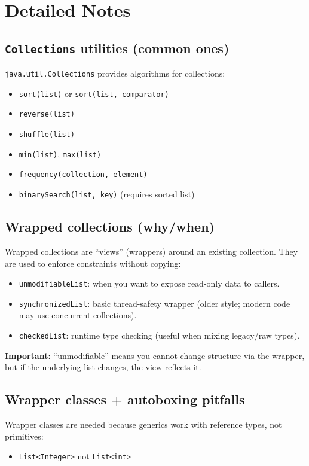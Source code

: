 \documentclass[11pt]{article}
\begin{document}
\section{Detailed Notes}
\subsection{\texttt{Collections} utilities (common ones)}
\texttt{java.util.Collections} provides algorithms for collections:
\begin{itemize}
  \item \texttt{sort(list)} or \texttt{sort(list, comparator)}
  \item \texttt{reverse(list)}
  \item \texttt{shuffle(list)}
  \item \texttt{min(list)}, \texttt{max(list)}
  \item \texttt{frequency(collection, element)}
  \item \texttt{binarySearch(list, key)} (requires sorted list)
\end{itemize}

\subsection{Wrapped collections (why/when)}
Wrapped collections are ``views'' (wrappers) around an existing collection.
They are used to enforce constraints without copying:
\begin{itemize}
  \item \texttt{unmodifiableList}: when you want to expose read-only data to callers.
  \item \texttt{synchronizedList}: basic thread-safety wrapper (older style; modern code may use concurrent collections).
  \item \texttt{checkedList}: runtime type checking (useful when mixing legacy/raw types).
\end{itemize}

\textbf{Important:} ``unmodifiable'' means you cannot change structure via the wrapper, but if the underlying list changes, the view reflects it.

\subsection{Wrapper classes + autoboxing pitfalls}
Wrapper classes are needed because generics work with reference types, not primitives:
\begin{itemize}
  \item \texttt{List<Integer>} not \texttt{List<int>}
\end{itemize}
\end{document}
